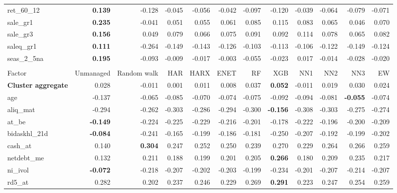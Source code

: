 \begin{landscape}
\begin{longtable}{>{\raggedright\arraybackslash}p{2.6cm}rrrrrrrrrrr}
ret\_60\_12 & \textbf{0.139} & -0.128 & -0.045 & -0.056 & -0.042 & -0.097 & -0.120 & -0.039 & -0.064 & -0.079 & -0.071 \\
sale\_gr1 & \textbf{0.235} & -0.041 & 0.051 & 0.055 & 0.061 & 0.085 & 0.115 & 0.083 & 0.065 & 0.046 & 0.070 \\
sale\_gr3 & \textbf{0.156} & 0.049 & 0.079 & 0.066 & 0.075 & 0.091 & 0.092 & 0.114 & 0.078 & 0.065 & 0.082 \\
saleq\_gr1 & \textbf{0.111} & -0.264 & -0.149 & -0.143 & -0.126 & -0.103 & -0.113 & -0.106 & -0.122 & -0.149 & -0.124 \\
seas\_2\_5na & \textbf{0.195} & -0.093 & -0.009 & -0.017 & -0.003 & -0.055 & -0.023 & 0.017 & -0.014 & -0.028 & -0.020 \\
\hline
\multicolumn{12}{@{}l}{\textit{Panel D. Low Leverage}} \\
\hline
Factor & Unmanaged & Random walk & HAR & HARX & ENET & RF & XGB & NN1 & NN2 & NN3 & EW \\
\hline
\textbf{Cluster aggregate} & 0.028 & -0.011 & 0.001 & 0.011 & 0.008 & \cellcolor{blue!10}0.037 & \textbf{\cellcolor{blue!10}0.052} & -0.011 & 0.019 & \cellcolor{blue!10}0.030 & 0.024 \\
age & -0.137 & -0.065 & -0.085 & -0.070 & -0.074 & -0.075 & -0.092 & -0.094 & -0.081 & \textbf{\cellcolor{blue!10}-0.055} & -0.074 \\
aliq\_mat & -0.294 & -0.262 & -0.303 & -0.286 & -0.294 & -0.300 & \textbf{\cellcolor{blue!10}-0.156} & -0.308 & -0.303 & -0.275 & -0.274 \\
at\_be & \textbf{-0.149} & -0.224 & -0.225 & -0.229 & -0.216 & -0.201 & -0.178 & -0.222 & -0.196 & -0.200 & -0.209 \\
bidaskhl\_21d & \textbf{-0.084} & -0.241 & -0.165 & -0.199 & -0.186 & -0.181 & -0.250 & -0.207 & -0.192 & -0.199 & -0.202 \\
cash\_at & 0.140 & \textbf{0.304} & 0.247 & 0.252 & 0.250 & 0.239 & 0.270 & 0.229 & 0.264 & 0.266 & 0.259 \\
netdebt\_me & 0.132 & 0.211 & 0.188 & 0.199 & 0.201 & 0.205 & \textbf{\cellcolor{blue!10}0.266} & 0.180 & 0.209 & \cellcolor{blue!10}0.235 & \cellcolor{blue!10}0.217 \\
ni\_ivol & \textbf{-0.072} & -0.218 & -0.207 & -0.202 & -0.203 & -0.199 & -0.234 & -0.201 & -0.207 & -0.214 & -0.207 \\
rd5\_at & 0.282 & 0.202 & 0.237 & 0.246 & 0.229 & 0.269 & \textbf{\cellcolor{blue!10}0.291} & 0.223 & 0.247 & 0.254 & 0.259 \\

\end{longtable}
\end{landscape}
